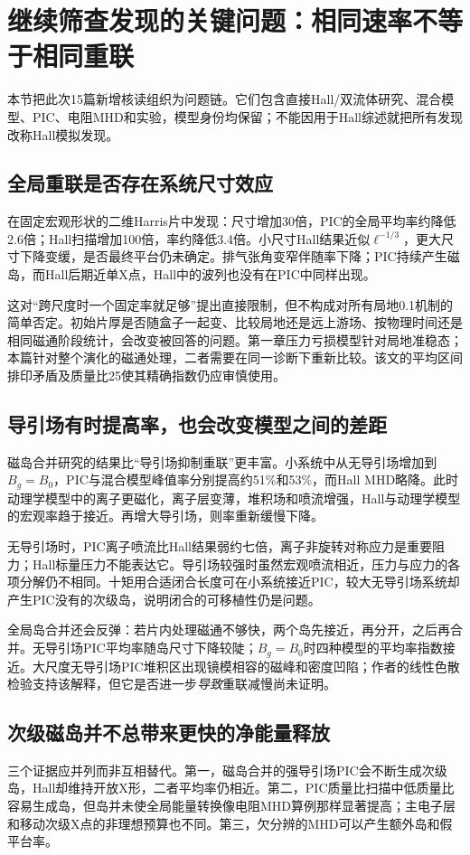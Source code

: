 \section{继续筛查发现的关键问题：相同速率不等于相同重联}
\label{sec:remaining-findings}
本节把此次15篇新增核读组织为问题链。它们包含直接Hall/双流体研究、混合模型、PIC、电阻MHD和实验，模型身份均保留；不能因用于Hall综述就把所有发现改称Hall模拟发现。

\subsection{全局重联是否存在系统尺寸效应}
\citet{F600}在固定宏观形状的二维Harris片中发现：尺寸增加30倍，PIC的全局平均率约降低2.6倍；Hall扫描增加100倍，率约降低3.4倍。小尺寸Hall结果近似$\ell^{-1/3}$，更大尺寸下降变缓，是否最终平台仍未确定。排气张角变窄伴随率下降；PIC持续产生磁岛，而Hall后期近单X点，Hall中的波列也没有在PIC中同样出现。

这对“跨尺度时一个固定率就足够”提出直接限制，但不构成对所有局地0.1机制的简单否定。初始片厚是否随盒子一起变、比较局地还是远上游场、按物理时间还是相同磁通阶段统计，会改变被回答的问题。第一章压力亏损模型针对局地准稳态；本篇针对整个演化的磁通处理，二者需要在同一诊断下重新比较。该文的平均区间排印矛盾及质量比25使其精确指数仍应审慎使用。

\subsection{导引场有时提高率，也会改变模型之间的差距}
磁岛合并研究\citep{L241}的结果比“导引场抑制重联”更丰富。小系统中从无导引场增加到$B_g=B_0$，PIC与混合模型峰值率分别提高约51\%和53\%，而Hall MHD略降。此时动理学模型中的离子更磁化，离子层变薄，堆积场和喷流增强，Hall与动理学模型的宏观率趋于接近。再增大导引场，则率重新缓慢下降。

无导引场时，PIC离子喷流比Hall结果弱约七倍，离子非旋转对称应力是重要阻力；Hall标量压力不能表达它。导引场较强时虽然宏观喷流相近，压力与应力的各项分解仍不相同。十矩用合适闭合长度可在小系统接近PIC，较大无导引场系统却产生PIC没有的次级岛，说明闭合的可移植性仍是问题。

全局岛合并还会反弹：若片内处理磁通不够快，两个岛先接近，再分开，之后再合并。无导引场PIC平均率随岛尺寸下降较陡；$B_g=B_0$时四种模型的平均率指数接近。大尺度无导引场PIC堆积区出现镜模相容的磁峰和密度凹陷；作者的线性色散检验支持该解释，但它是否进一步\emph{导致}重联减慢尚未证明。

\subsection{次级磁岛并不总带来更快的净能量释放}
三个证据应并列而非互相替代。第一，磁岛合并的强导引场PIC会不断生成次级岛，Hall却维持开放X形，二者平均率仍相近\citep{L241}。第二，PIC质量比扫描中低质量比容易生成岛，但岛并未使全局能量转换像电阻MHD算例那样显著提高；主电子层和移动次级X点的非理想预算也不同\citep{F606}。第三，欠分辨的MHD可以产生额外岛和假平台率\citep{F788}。

